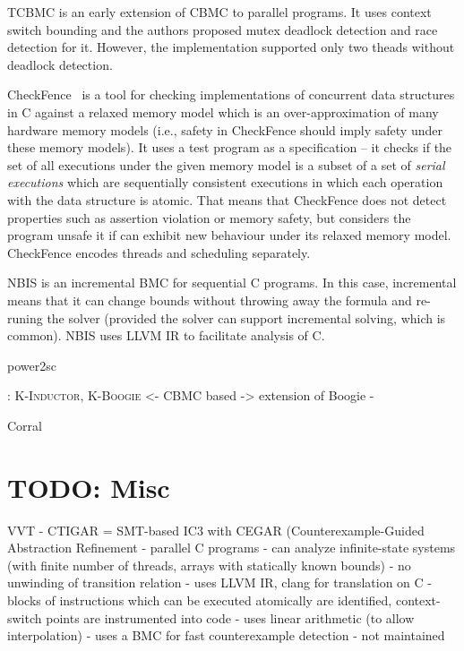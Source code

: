 TCBMC  is an early extension of CBMC to parallel programs.
It uses context switch bounding and the authors proposed mutex deadlock detection and race detection for it.
However, the implementation supported only two theads without deadlock detection.

CheckFence~ is a tool for checking implementations of concurrent data structures in C against a relaxed memory model which is an over-approximation of many hardware memory models (i.e., safety in CheckFence should imply safety under these memory models).
It uses a test program as a specification -- it checks if the set of all executions under the given memory model is a subset of a set of \emph{serial executions} which are sequentially consistent executions in which each operation with the data structure is atomic.
That means that CheckFence does not detect properties such as assertion violation or memory safety, but considers the program unsafe it if can exhibit new behaviour under its relaxed memory model.
CheckFence encodes threads and scheduling separately.


NBIS  is an incremental BMC for sequential C programs.
In this case, incremental means that it can change bounds without throwing away the formula and re-runing the solver (provided the solver can support incremental solving, which is common).
NBIS uses LLVM IR to facilitate analysis of C.

power2sc 


: \textsc{K-Inductor}, \textsc{K-Boogie}
<- CBMC based
-> extension of Boogie
- 

Corral

\section{TODO: Misc}

VVT 
- CTIGAR = SMT-based IC3 with CEGAR (Counterexample-Guided Abstraction Refinement 
- parallel C programs
- can analyze infinite-state systems (with finite number of threads, arrays with statically known bounds)
- no unwinding of transition relation
- uses LLVM IR, clang for translation on C
- blocks of instructions which can be executed atomically are identified, context-switch points are instrumented into code
- uses linear arithmetic (to allow interpolation)
- uses a BMC for fast counterexample detection
- not maintained

